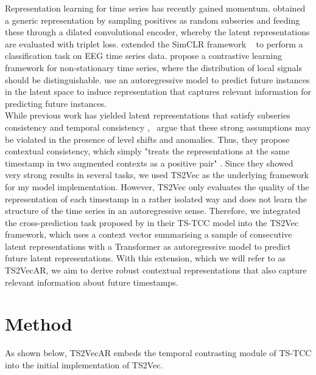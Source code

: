 \documentclass{article}
\begin{document}
Representation learning for time series has recently gained momentum. \citet{franceschi2019} obtained a generic representation by sampling positives as random subseries and feeding these through a dilated convolutional encoder, whereby the latent representations are evaluated with triplet loss. \citet{mohsenvand2020} extended the SimCLR framework \citep{simclr}  to perform a classification task on EEG time series data. \citet{tonekaboni2021} propose a contrastive learning framework for non-stationary time series, where the distribution of local signals should be distinguishable. \citet{oord2018} use an autoregressive model to predict future instances in the latent space to induce representation that captures relevant information for predicting future instances. \\

While previous work has yielded latent representations that satisfy subseries consistency \citep{franceschi2019} and temporal consistency \citep{tonekaboni2021}, \citet{ts2vec} argue that these strong assumptions may be violated in the presence of level shifts and anomalies. Thus, they propose contextual consistency, which simply "treats the representations at the same timestamp in two augmented contexts as a positive pair" \citep[p. 8982]{ts2vec}. Since they showed very strong results in several tasks, we used TS2Vec as the underlying framework for my model implementation. However, TS2Vec only evaluates the quality of the representation of each timestamp in a rather isolated way and does not learn the structure of the time series in an autoregressive sense. Therefore, we integrated the cross-prediction task proposed by \citet{tstcc} in their TS-TCC model into the TS2Vec framework, which uses a context vector summarising a sample of consecutive latent representations with a Transformer \citep{vaswani2017} as autoregressive model to predict future latent representations. With this extension, which we will refer to as TS2VecAR, we aim to derive robust contextual representations that also capture relevant information about future timestamps.

\section{Method}

As shown below, TS2VecAR embeds the temporal contrasting module of TS-TCC into the initial implementation of TS2Vec.
\end{document}
